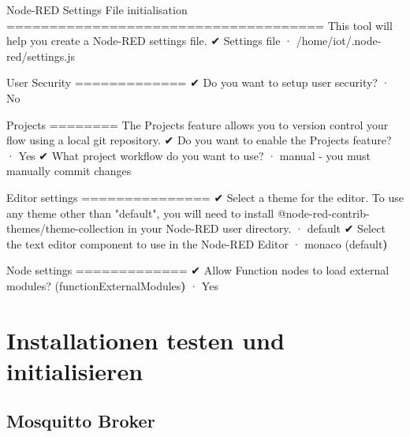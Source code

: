 \documentclass[
  11pt,
  a4paper,
  oneside, openany  ,captions=tableheading
]{scrbook}
\newenvironment{Shaded}{\begin{snugshade}}{\end{snugshade}}
\newcommand{\AttributeTok}[1]{\textcolor[rgb]{0.40,0.45,0.13}{#1}}
\newcommand{\ErrorTok}[1]{\textcolor[rgb]{0.68,0.00,0.00}{#1}}
\newcommand{\ExtensionTok}[1]{\textcolor[rgb]{0.00,0.23,0.31}{#1}}
\newcommand{\KeywordTok}[1]{\textcolor[rgb]{0.00,0.23,0.31}{\textbf{#1}}}
\newcommand{\NormalTok}[1]{\textcolor[rgb]{0.00,0.23,0.31}{#1}}
\newcommand{\PreprocessorTok}[1]{\textcolor[rgb]{0.68,0.00,0.00}{#1}}
\newcommand{\StringTok}[1]{\textcolor[rgb]{0.13,0.47,0.30}{#1}}
\theoremstyle{remark}
\begin{document}
\begin{Shaded}
\begin{Highlighting}[]
\ExtensionTok{Node{-}RED}\NormalTok{ Settings File initialisation}
\ExtensionTok{=====================================}
\ExtensionTok{This}\NormalTok{ tool will help you create a Node{-}RED settings file.}
\ExtensionTok{✔}\NormalTok{ Settings file · /home/iot/.node{-}red/settings.js}

\ExtensionTok{User}\NormalTok{ Security}
\ExtensionTok{=============}
\ExtensionTok{✔}\NormalTok{ Do you want to setup user security}\PreprocessorTok{?}\NormalTok{ · No}

\ExtensionTok{Projects}
\ExtensionTok{========}
\ExtensionTok{The}\NormalTok{ Projects feature allows you to version control your flow using a local git repository.}
\ExtensionTok{✔}\NormalTok{ Do you want to enable the Projects feature}\PreprocessorTok{?}\NormalTok{ · Yes}
\ExtensionTok{✔}\NormalTok{ What project workflow do you want to use}\PreprocessorTok{?}\NormalTok{ · manual }\AttributeTok{{-}}\NormalTok{ you must manually commit changes}

\ExtensionTok{Editor}\NormalTok{ settings}
\ExtensionTok{===============}
\ExtensionTok{✔}\NormalTok{ Select a theme for the editor. To use any theme other than }\StringTok{"default"}\NormalTok{, you will need to install @node{-}red{-}contrib{-}themes/theme{-}collection in your Node{-}RED user directory. · default}
\ExtensionTok{✔}\NormalTok{ Select the text editor component to use in the Node{-}RED Editor · monaco }\ErrorTok{(}\ExtensionTok{default}\KeywordTok{)}

\ExtensionTok{Node}\NormalTok{ settings}
\ExtensionTok{=============}
\ExtensionTok{✔}\NormalTok{ Allow Function nodes to load external modules}\PreprocessorTok{?} \ErrorTok{(}\ExtensionTok{functionExternalModules}\KeywordTok{)} \ExtensionTok{·}\NormalTok{ Yes}
\end{Highlighting}
\end{Shaded}

\section{Installationen testen und
initialisieren}\label{installationen-testen-und-initialisieren}

\subsection{Mosquitto Broker}\label{mosquitto-broker}
\end{document}
